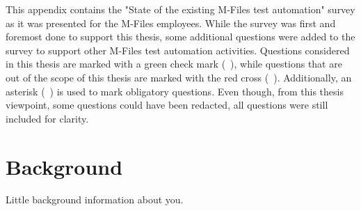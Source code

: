 \newcommand{\likertscalesmall}[2]{
	\begin{center}
		\begin{tabular}{c c c}
			& & \\
			& \likertscaledescription & \\ 
			#1 & \likertscalebuttons & #2 \\
			& & \\
		\end{tabular}
	\end{center}
}

\newcommand{\likertscalelarge}[2]{
	\begin{tabularx}{\textwidth}{X c X}
		& & \\
		& \likertscaledescription & \\ 
		#1 & \likertscalebuttons & #2 \\
		& & \\
	\end{tabularx}
}

This appendix contains the "State of the existing M-Files test automation" survey as it was presented for the M-Files employees. While the survey was first and foremost done to support this thesis, some additional questions were added to the survey to support other M-Files test automation activities. Questions considered in this thesis are marked with a green check mark (\greencheckmark\ ), while questions that are out of the scope of this thesis are marked with the red cross (\redcross\ ). Additionally, an asterisk (\surveyasterix\ ) is used to mark obligatory questions. Even though, from this thesis viewpoint, some questions could have been redacted, all questions were still included for clarity.

\section*{Background}
Little background information about you.

